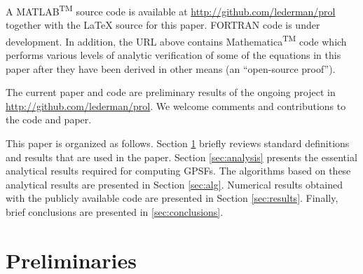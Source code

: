\documentclass[12pt]{article}
\begin{document}
A MATLAB\textsuperscript{TM} source code is available at \url{http://github.com/lederman/prol} together with the LaTeX source for this paper. FORTRAN code is under development.
In addition, the URL above contains Mathematica\textsuperscript{TM} code which performs various levels of analytic verification of some of the equations in this paper after they have been derived in other means (an ``open-source proof''). 

The current paper and code are preliminary results of the ongoing project in  \url{http://github.com/lederman/prol}. We welcome comments and contributions to the code and paper. 

This paper is organized as follows. Section \ref{sec:pre} briefly reviews standard definitions and results that are used in the paper. Section \ref{sec:analysis} presents the essential analytical results required for computing GPSFs. 
The algorithms based on these analytical results are presented in Section \ref{sec:alg}.
Numerical results obtained with the publicly available code are presented in Section \ref{sec:results}.
Finally, brief conclusions are presented in \ref{sec:conclusions}.

\section{Preliminaries}\label{sec:pre}


%
%
%
\end{document}
